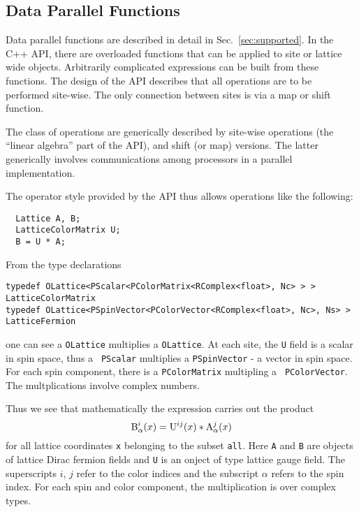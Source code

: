\documentclass[12pt,letterpaper]{article}
\newcommand{\cpp}{C++}
\begin{document}
\newpage

\subsection{Data Parallel Functions}

Data parallel functions are described in detail in
Sec.~\ref{sec:supported}.  
In the \cpp{} API, there are overloaded functions that can be applied
to site or lattice wide objects. Arbitrarily complicated expressions
can be built from these functions.  The design of the API describes
that all operations are to be performed site-wise. The only connection
between sites is via a map or shift function.

The class of operations are generically described by site-wise
operations (the ``linear algebra'' part of the API), and shift (or
map) versions. The latter generically involves communications among
processors in a parallel implementation.

The operator style provided by the API thus allows operations like
the following:
%
\begin{verbatim}
  Lattice A, B;
  LatticeColorMatrix U;
  B = U * A;
\end{verbatim}
%
From the type declarations
%
\begin{small}
\begin{verbatim}
typedef OLattice<PScalar<PColorMatrix<RComplex<float>, Nc> > > LatticeColorMatrix
typedef OLattice<PSpinVector<PColorVector<RComplex<float>, Nc>, Ns> > LatticeFermion
\end{verbatim}
\end{small}
%
one can see a {\tt OLattice} multiplies a {\tt OLattice}. At each
site, the {\tt U} field is a scalar in spin space, thus a {\tt
PScalar} multiplies a {\tt PSpinVector} - a vector in spin space. For
each spin component, there is a {\tt PColorMatrix} multipling a {\tt
PColorVector}. The multplications involve complex numbers. 

Thus we see that mathematically the expression carries out the product
%
\begin{displaymath}
{\rm B}_\alpha^{i}(x) = {\rm U}^{i j}(x) * {\rm A}_\alpha^{j}(x)
\end{displaymath}
%
for all lattice coordinates {\tt x} belonging to the subset {\tt all}.
Here {\tt A} and {\tt B} are objects of lattice Dirac fermion fields
and {\tt U} is an onject of type lattice gauge field. The superscripts
$i$, $j$ refer to the color indices and the subscript $\alpha$ refers
to the spin index. For each spin and color component, the
multiplication is over complex types.
\end{document}
